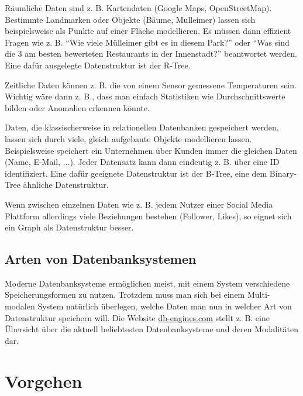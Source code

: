 \documentclass[11pt,a4paper]{article}
\begin{document}
Räumliche Daten sind z. B. Kartendaten (Google Maps, OpenStreetMap). Bestimmte Landmarken oder Objekte
(Bäume, Mulleimer) lassen sich beispielsweise als Punkte auf einer Fläche modellieren.
Es müssen dann effizient Fragen wie z. B. ``Wie viele Mülleimer gibt es in diesem Park?'' oder ``Was sind
die 3 am besten bewerteten Restaurants in der Innenstadt?'' beantwortet werden.
Eine dafür ausgelegte Datenstruktur ist der R-Tree.

\vspace*{0.3cm}

Zeitliche Daten können z. B. die von einem Sensor gemessene Temperaturen sein.
Wichtig wäre dann z. B., dass man einfach Statistiken wie Durchschnittswerte bilden
oder Anomalien erkennen könnte.

\vspace*{0.3cm}

Daten, die klassischerweise in relationellen Datenbanken gespeichert werden,
lassen sich durch viele, gleich aufgebaute Objekte modellieren lassen.
Beispielsweise speichert ein Unternehmen über Kunden immer die gleichen Daten
(Name, E-Mail, ...). Jeder Datensatz kann dann eindeutig z. B. über eine
ID identifiziert. Eine dafür geeignete Datenstruktur ist der B-Tree, eine
dem Binary-Tree ähnliche Datenstruktur.

\vspace*{0.3cm}

Wenn zwischen einzelnen Daten wie z. B. jedem Nutzer einer Social Media Plattform
allerdings viele Beziehungen bestehen (Follower, Likes), so eignet sich ein Graph
als Datenstruktur besser.

\subsection{Arten von Datenbanksystemen}

Moderne Datenbanksysteme ermöglichen meist, mit einem System verschiedene
Speicherungsformen zu nutzen. Trotzdem muss man sich bei einem Multi-modalen System
natürlich überlegen, welche Daten man nun in welcher Art von Datenstruktur speichern
will. Die Website \href{https://db-engines.com/en/ranking}{db-engines.com} stellt z. B.
eine Übersicht über die aktuell beliebtesten Datenbanksysteme und deren Modalitäten dar.

\section{Vorgehen}
\end{document}
